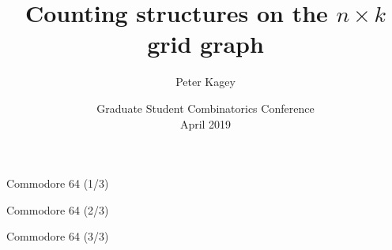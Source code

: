 \documentclass{beamer}%
\title{Counting structures on the $n \times k$ grid graph}
\author{Peter Kagey}
\institute{University of Southern California}
\date[]{
  Graduate Student Combinatorics Conference\\
  April 2019
}
\begin{document}
\begin{frame}
  \titlepage
\end{frame}


\begin{frame}{Commodore 64 (1/3)} %
\end{frame}

\begin{frame}{Commodore 64 (2/3)} %
\end{frame}

\begin{frame}{Commodore 64 (3/3)} %
\end{frame}
\end{document}

